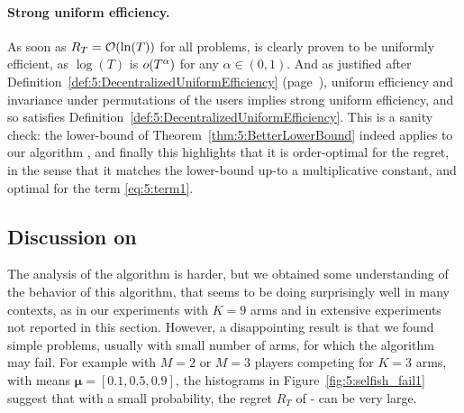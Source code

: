 

\paragraph{Strong uniform efficiency.}\label{app:5:JustifyingDefinition5}
%
As soon as $R_T = \mathop{}\mathopen{}\mathcal{O}\mathopen{}\left(\ln(T)\right)$ for all problems, \MCTopM{} is clearly proven
to be uniformly efficient, as $\log(T)$ is $\mathop{}\mathopen{}o\mathopen{}\left(T^{\alpha}\right)$ for any $\alpha\in(0,1)$.
%
And as justified after Definition~\ref{def:5:DecentralizedUniformEfficiency} (page~\pageref{def:5:DecentralizedUniformEfficiency}), uniform efficiency and invariance under permutations of the users implies strong uniform efficiency, and so \MCTopM{} satisfies Definition~\ref{def:5:DecentralizedUniformEfficiency}.
%
This is a sanity check: the lower-bound of
Theorem~\ref{thm:5:BetterLowerBound} indeed applies to our algorithm \MCTopM,
and finally this highlights that it is order-optimal for the regret, in the sense that it matches the lower-bound up-to a multiplicative constant,
and optimal for the term \ref{eq:5:term1}.


\subsection{Discussion on \Selfish}\label{sub:5:SelfishFails}

The analysis of the \Selfish{} algorithm is harder, but we obtained some understanding of the behavior of this algorithm, that seems to be doing surprisingly well in many contexts, as in our experiments with $K=9$ arms and in extensive experiments not reported in this section. However, a disappointing result is that we found simple problems, usually with small number of arms, for which the algorithm may fail. For example with $M=2$ or $M=3$ players competing for $K=3$ arms,
with means $\boldsymbol{\mu} = [0.1, 0.5, 0.9]$, the histograms in Figure~\ref{fig:5:selfish_fail1} suggest that with a small probability, the regret $R_T$ of \Selfish-\klUCB{} can be very large.

